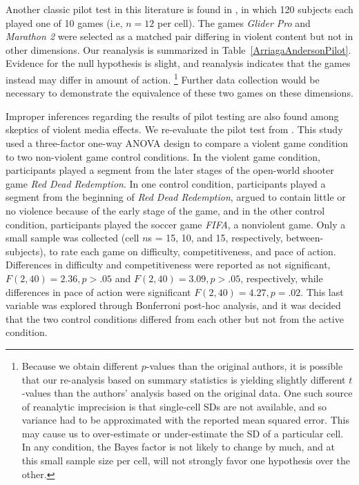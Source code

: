 \documentclass[man]{apa6}
\begin{document}
Another classic pilot test in this literature is found in \citet[study 1]{Anderson:etal:2004}, in which 120 subjects each played one of 10 games (i.e, $n = 12$ per cell). The games {\em Glider Pro} and {\em Marathon 2} were selected as a matched pair differing in violent content but not in other dimensions. Our reanalysis is summarized in Table~\ref{ArriagaAndersonPilot}. Evidence for the null hypothesis is slight, and reanalysis indicates that the games instead may differ in amount of action. \footnote{Because we obtain different $p$-values than the original authors, it is possible that our re-analysis based on summary statistics is yielding slightly different $t$-values than the authors' analysis based on the original data. One such source of reanalytic imprecision is that single-cell SDs are not available, and so variance had to be approximated with the reported mean squared error. This may cause us to over-estimate or under-estimate the SD of a particular cell. In any condition, the Bayes factor is not likely to change by much, and at this small sample size per cell, will not strongly favor one hypothesis over the other.} Further data collection would be necessary to demonstrate the equivalence of these two games on these dimensions. 

Improper inferences regarding the results of pilot testing are also found among skeptics of violent media effects. We re-evaluate the pilot test from \citet{Valadez:Ferguson:2012}. This study used a three-factor one-way ANOVA design to compare a violent game condition to two non-violent game control conditions. In the violent game condition, participants played a segment from the later stages of the open-world shooter game {\em Red Dead Redemption}. In one control condition, participants played a segment from the beginning of {\em Red Dead Redemption}, argued to contain little or no violence because of the early stage of the game, and in the other control condition, participants played the soccer game {\em FIFA}, a nonviolent game. Only a small sample was collected (cell $n$s = 15, 10, and 15, respectively, between-subjects), to rate each game on difficulty, competitiveness, and pace of action. Differences in difficulty and competitiveness were reported as not significant, $F(2,40) = 2.36, p > .05$ and $F(2, 40) = 3.09, p > .05$, respectively, while differences in pace of action were significant $F(2, 40) = 4.27, p = .02$. This last variable was explored through Bonferroni post-hoc analysis, and it was decided that the two control conditions differed from each other but not from the active condition. 
\end{document}
